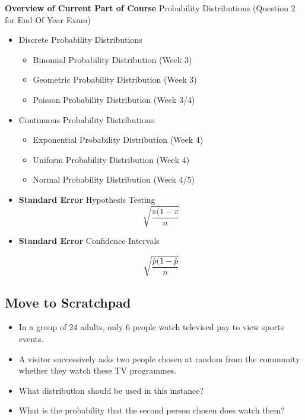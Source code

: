 \documentclass[]{report}
\begin{document}
{
\textbf{Overview of Current Part of Course}
Probability Distributions (Question 2 for End Of Year Exam)
\begin{itemize}
\item  Discrete Probability Distributions
\begin{itemize}
\item  Binomial Probability Distribution (Week 3)
\item  Geometric Probability Distribution (Week 3)
\item  Poisson Probability Distribution (Week 3/4)
\end{itemize}

\item  Continuous Probability Distributions
\begin{itemize}
\item  Exponential Probability Distribution (Week 4)
\item  Uniform Probability Distribution (Week 4)
\item  Normal Probability Distribution (Week 4/5)
\end{itemize}
\end{itemize}
}

\begin{itemize}
\item \textbf{Standard Error}
Hypothesis Testing
\[\sqrt{\frac{\pi (1- \pi}{n}}\]

\item \textbf{Standard Error}
Confidence Intervals

\[\sqrt{\frac{\bar{p} (1- \bar{p}}{n}}\]
\end{itemize}




\subsection{Move to Scratchpad}
\begin{itemize}
\item In a group of 24 adults, only 6 people watch televised pay to view
sports events. \item A visitor successively asks two people chosen at random from the
community whether they watch these TV programmes.
\item What distribution should be used in this instance? \item What is the probability
that the second person chosen does watch them?
\end{itemize}
\end{document}
